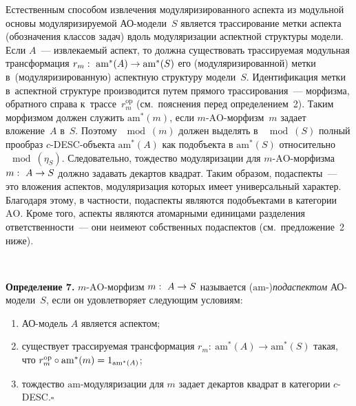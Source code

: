 \begin{multicols}{2}
 \medskip

 Естественным способом извлечения модуляризированного аспекта из
модульной основы модуляризируемой АО-мо\-де\-ли~$S$ является
трассирование метки аспекта (обозначения классов задач) вдоль модуляризации
аспектной структуры модели. Если $A$~--- извлекаемый аспект, то должна
существовать трассируемая модульная трансформация $r_m:\ \mathrm{am}^*(A) \hm\to
\mathrm{am}^*(S)$ его (модуляризированной) метки в~(модуляризированную) аспектную
структуру модели~$S$. Идентификация метки в~аспектной структуре
производится путем прямого трассирования~--- морфизма, обратного справа
к~трассе~$r_m^{\mathrm{op}}$ (см.\ пояснения перед определением~2). Таким
морфизмом должен служить $\mathrm{am}^*(m)$, если $m$-$\mathrm{AO}$-мор\-физм~$m$ задает
вложение~$A$ в~$S$. Поэтому $\mod(m)$ должен выделять в~$\mod(S)$ полный
прообраз \mbox{$c$-DESC}-объ\-екта $\mathrm{am}^*(A)$ как подобъекта в $\mathrm{am}^*(S)$
относительно $\mod(\eta_S)$. Следовательно, тождество модуляризации для
 $m$-$\mathrm{AO}$-мор\-физ\-ма $m:\ A\hm\to S$ должно задавать декартов квадрат.
Таким образом, подаспекты~--- это вложения аспектов, модуляризация которых
имеет универсальный характер. Благодаря этому, в частности, подаспекты
являются подобъектами в категории~$\mathrm{AO}$. Кроме того, аспекты являются
атомарными единицами разделения ответственности~--- они не\linebreak имеют
собственных подаспектов (см.\ предложение~2 ниже).

 \vspace*{6pt}
 \begin{center}
 \mbox{%
 \epsfxsize=59.413mm
 }
 \end{center}



 \noindent
 \textbf{Определение 7.} $m$-$\mathrm{AO}$-мор\-физм $m:\ A \hm\to S$ называется
($\mathrm{am}$-)\textit{подаспектом} АО-мо\-де\-ли~$S$, если он удовлетворяет
следующим условиям:

\columnbreak

\noindent
 \begin{enumerate}[($i$)]
\item АО-модель $A$ является аспектом;
\item существует трассируемая трансформация
$r_m:\ \mathrm{am}^*(A) \to \mathrm{am}^*(S)$
такая, что $r_m^{\mathrm{op}}\hm\circ \mathrm{am}^*(m) \hm= 1_{\mathrm{am}^*(A)}$;
\item тождество $\mathrm{am}$-модуляризации для $m$ задает декартов квадрат в
категории $c$-DESC.\hfill$\square$
\end{enumerate}


\end{multicols}

